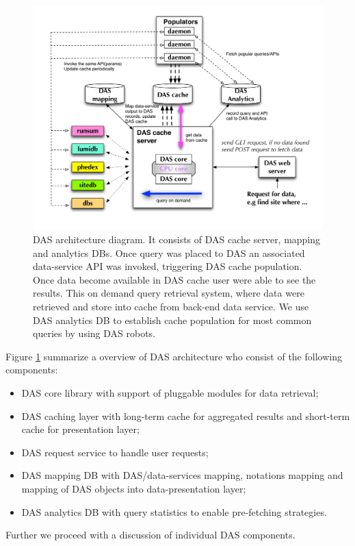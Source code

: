 \documentclass[a4paper]{jpconf}
\begin{document}
\begin{figure}[htb]
\centering
\includegraphics[width=150mm]{DAS_Cache_and_Analytics.pdf}
\caption{
DAS architecture diagram. It consists of DAS cache server, mapping and analytics DBs.
Once query was placed to DAS an associated
data-service API was invoked, triggering DAS cache population. Once data become
available in DAS cache user were able to see the results. This on demand
query retrieval system, where data were retrieved and store into cache from
back-end data service. We use DAS analytics DB to establish cache population
for most common queries by using DAS robots.
}
\label{DAS_cache}
\end{figure}

\noindent
Figure \ref{DAS_cache} summarize a overview of DAS architecture who consist of the
following components:
\begin{itemize}
\item DAS core library with support of pluggable modules for data retrieval;
\item DAS caching layer with long-term cache for aggregated results and short-term
cache for presentation layer;
\item DAS request service to handle user requests;
\item DAS mapping DB with DAS/data-services mapping, notations mapping and
mapping of DAS objects into data-presentation layer;
\item DAS analytics DB with query statistics to enable pre-fetching 
strategies.
\end{itemize}
Further we proceed with a discussion of individual DAS components.
\end{document}
